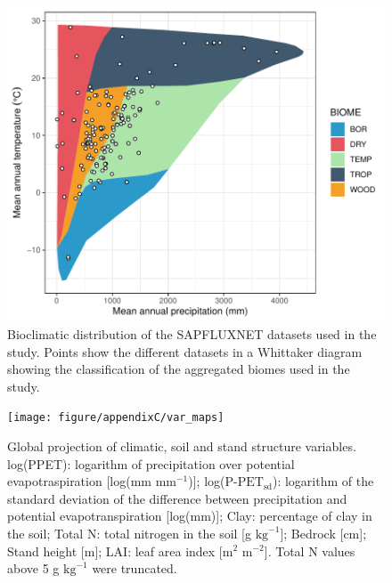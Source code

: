 \documentclass[11pt,twoside]{reedthesis}
\begin{document}
\newpage

\setlength{\abovecaptionskip}{15pt}
\begin{figure}[H]

{\centering \includegraphics[width=1\linewidth]{figure/appendixC/gg_biomes} 

}

\caption[Bioclimatic distribution of the SAPFLUXNET datasets used in the study.]{Bioclimatic distribution of the SAPFLUXNET datasets used in the study. Points show the different datasets in a Whittaker diagram showing the classification of the aggregated biomes used in the study.}\label{fig:unnamed-chunk-9}
\end{figure}
\setlength{\abovecaptionskip}{0pt}

\newpage

\setlength{\abovecaptionskip}{15pt}
\begin{figure}[H]

{\centering \texttt{[image: figure/appendixC/var\_maps]} 

}

\caption[Global projection of climatic, soil and stand structure variables.]{Global projection of climatic, soil and stand structure variables. log(PPET): logarithm of precipitation over potential evapotraspiration [log(mm $\text{mm}^{-1}$)]; log($\text{P-PET}_{\text{sd}}$): logarithm of the standard deviation of the difference between precipitation and potential evapotranspiration [log(mm)]; Clay: percentage of clay in the soil; Total N: total nitrogen in the soil [g $\text{kg}^{-1}$];  Bedrock [cm]; Stand height [m]; LAI: leaf area index [$\text{m}^2$ $\text{m}^{-2}$]. Total N values above 5 g $\text{kg}^{-1}$ were truncated.}\label{fig:unnamed-chunk-10}
\end{figure}
\setlength{\abovecaptionskip}{0pt}
\end{document}
